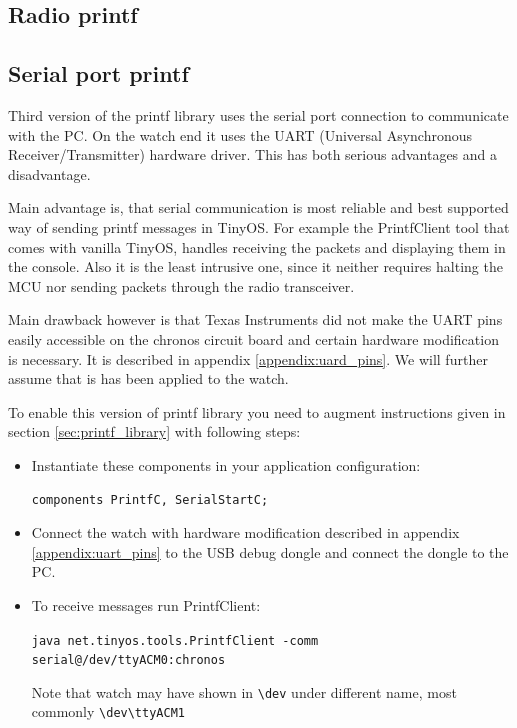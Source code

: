 \subsection{Radio printf}

\subsection{Serial port printf}
Third version of the printf library uses the serial port connection to
communicate with the PC. On the watch end it uses the UART (Universal
Asynchronous Receiver/Transmitter) hardware driver. This has both
serious advantages and a disadvantage.

Main advantage is, that serial communication is most reliable and best
supported way of sending printf messages in TinyOS. For example the
PrintfClient tool that comes with vanilla TinyOS, handles receiving
the packets and displaying them in the console. Also it is the least
intrusive one, since it neither requires halting the MCU nor sending
packets through the radio transceiver.

Main drawback however is that Texas Instruments did not make the UART
pins easily accessible on the chronos circuit board and certain
hardware modification is necessary.  It is described in appendix
\ref{appendix:uard_pins}. We will further assume that is has been
applied to the watch.

To enable this version of printf library you need to augment
instructions given in section \ref{sec:printf_library} with following
steps:

\begin{itemize}
  \item Instantiate these components in your application configuration:

  \texttt{components PrintfC, SerialStartC;}

  \item Connect the watch with hardware modification described in
    appendix \ref{appendix:uart_pins} to the USB debug dongle and
    connect the dongle to the PC.

  \item To receive messages run PrintfClient:

  \texttt{java net.tinyos.tools.PrintfClient -comm serial@/dev/ttyACM0:chronos}

  Note that watch may have shown in \texttt{\textbackslash dev} under
  different name, most commonly
  \texttt{\textbackslash dev\textbackslash ttyACM1}
\end{itemize}

